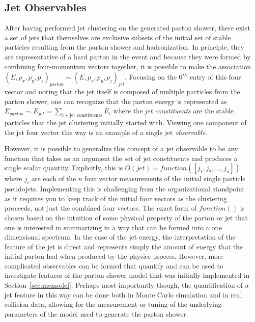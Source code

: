 \documentclass[UKenglish,texlive=2016]{\ATLASLATEXPATH atlasdoc}
\begin{document}
\begin{center}
\end{center}


\subsection{Jet Observables}
After having performed jet clustering on the generated parton shower, there exist a set of jets that themselves are exclusive subsets of the initial set of stable particles resulting from the parton shower and hadronization.  In principle, they are representative of a hard parton in the event and because they were formed by combining four-momentum vectors together, it is possible to make the association $(E,p_x,p_y,p_z)_{parton}\sim (E,p_x,p_y,p_z)_{jet}$.  Focusing on the 0$^{th}$ entry of this four vector and noting that the jet itself is composed of multiple particles from the parton shower, one can recognize that the parton energy is represented as $E_{parton}\sim E_{jet}=\sum_{i\in \text{jet constituents}}E_{i}$ where the \textit{jet constituents} are the stable particles that the jet clustering initially started with.  Viewing one component of the jet four vector this way is an example of a single jet \textit{observable}.

However, it is possible to generalize this concept of a jet observable to be any function that takes as an argument the set of jet constituents and produces a single scalar quantity.  Explicitly, this is $O(jet)=function([j_1,j_2 ,...,j_n])$ where $j_i$ are each of the $n$ four vector measurements of the initial single particle pseudojets.  Implementing this is challenging from the organizational standpoint as it requires you to keep track of the initial four vectors as the clustering proceeds, not just the combined four vectors.  The exact form of $function()$ is chosen based on the intuition of some physical property of the parton or jet that one is interested in summarizing in a way that can be formed into a one dimensional spectrum.  In the case of the jet energy, the interpretation of the feature of the jet is direct and represents simply the amount of energy that the initial parton had when produced by the physics process.  However, more complicated observables can be formed that quantify and can be used to investigate features of the parton shower model that was initially implemented in Section~\ref{sec:mcmodel}.  Perhaps most importantly though, the quantification of a jet feature in this way can be done both in Monte Carlo simulation and in real collision data, allowing for the measurement or tuning of the underlying parameters of the model used to generate the parton shower.
\end{document}
